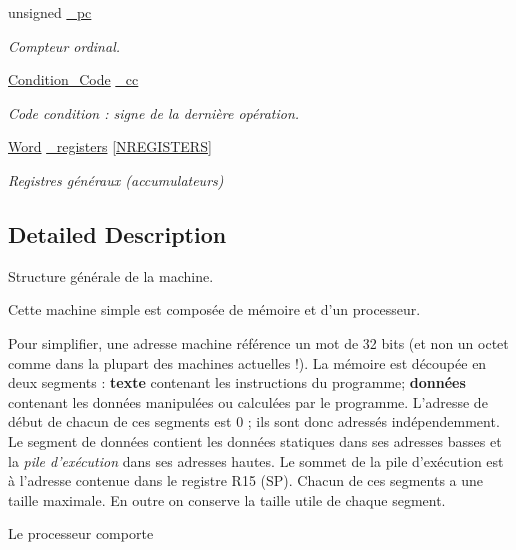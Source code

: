 \begin{DoxyCompactItemize}
unsigned \hyperlink{struct_machine_aeb680839a66dd8d6eb8e0f5971462b9a}{\-\_\-pc}
\begin{DoxyCompactList}\small\item\em \-Compteur ordinal. \end{DoxyCompactList}\item 
\hyperlink{machine_8h_a4bc92b6f72076bb5dd651a143f58a2c3}{\-Condition\-\_\-\-Code} \hyperlink{struct_machine_a741225dbae765ec0fa5cd14613334b66}{\-\_\-cc}
\begin{DoxyCompactList}\small\item\em \-Code condition \-: signe de la dernière opération. \end{DoxyCompactList}\item 
\hyperlink{instruction_8h_a0b5b15ce5f3a75b5dd0de6643cd3d958}{\-Word} \hyperlink{struct_machine_a2275469edc6c6cd7ecb8d75ec745d41f}{\-\_\-registers} \mbox{[}\hyperlink{machine_8h_a7fc2a43e54def648bc97e9f533a1e42f}{\-N\-R\-E\-G\-I\-S\-T\-E\-R\-S}\mbox{]}
\begin{DoxyCompactList}\small\item\em \-Registres généraux (accumulateurs) \end{DoxyCompactList}\end{DoxyCompactItemize}


\subsection{\-Detailed \-Description}
\-Structure générale de la machine. 

\-Cette machine simple est composée de mémoire et d'un processeur.

\-Pour simplifier, une adresse machine référence un mot de 32 bits (et non un octet comme dans la plupart des machines actuelles !). \-La mémoire est découpée en deux segments \-: {\bfseries texte} contenant les instructions du programme; {\bfseries données} contenant les données manipulées ou calculées par le programme. \-L'adresse de début de chacun de ces segments est 0 ; ils sont donc adressés indépendemment. \-Le segment de données contient les données statiques dans ses adresses basses et la {\itshape pile d'exécution\/} dans ses adresses hautes. \-Le sommet de la pile d'exécution est à l'adresse contenue dans le registre {\ttfamily \-R15} ({\ttfamily \-S\-P}). \-Chacun de ces segments a une taille maximale. \-En outre on conserve la taille utile de chaque segment.

\-Le processeur comporte



